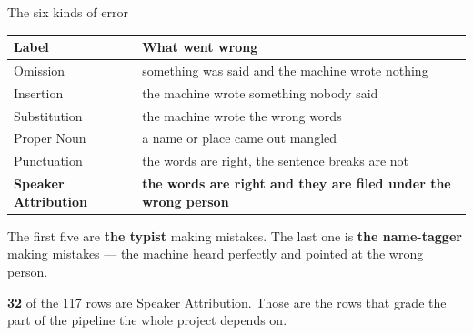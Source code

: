 \documentclass[aspectratio=169]{beamer}
\newcommand{\keybox}[1]{%
  \par\vspace{4pt}\begingroup\centering
  \colorbox{warmbg}{\parbox{0.93\textwidth}{\centering #1}}%
  \par\endgroup\vspace{2pt}}
\newenvironment{nicetable}[1]
  {\par\vspace{2pt}\begingroup\centering\small
   \renewcommand{\arraystretch}{1.18}%
   \setlength{\tabcolsep}{6pt}\rowcolors{2}{band}{white}%
   \begin{tabular}{#1}\arrayrulecolor{hdr}\toprule}
  {\bottomrule\end{tabular}\par\endgroup\vspace{2pt}}
\newcommand{\hd}[1]{\textcolor{hdr}{\textbf{#1}}}
\newcommand{\typist}{\textbf{the typist}}
\newcommand{\tagger}{\textbf{the name-tagger}}
\newcommand{\num}[1]{\textcolor{warm}{\textbf{#1}}}
\begin{document}
\begin{frame}{The six kinds of error}

\begin{nicetable}{p{3.3cm}p{9.2cm}}
\hd{Label} & \hd{What went wrong} \\ \midrule
Omission            & something was said and the machine wrote nothing \\
Insertion           & the machine wrote something nobody said \\
Substitution        & the machine wrote the wrong words \\
Proper Noun         & a name or place came out mangled \\
Punctuation         & the words are right, the sentence breaks are not \\
\textbf{Speaker Attribution} & \textbf{the words are right and they are filed under the wrong person} \\
\end{nicetable}

\vspace{0.3em}
The first five are \typist{} making mistakes. The last one is \tagger{} making mistakes ---
the machine heard perfectly and pointed at the wrong person.

\keybox{\num{32} of the 117 rows are Speaker Attribution. Those are the rows that grade
the part of the pipeline the whole project depends on.}

\end{frame}
\end{document}

